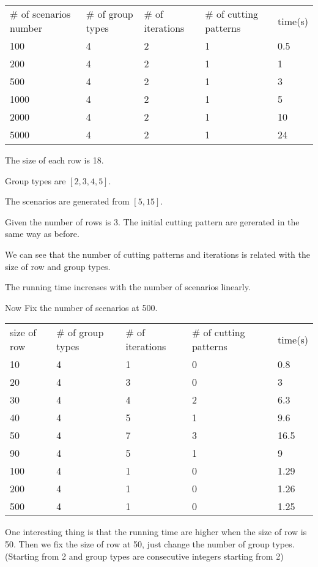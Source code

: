 \begin{table}[ht]
  \begin{tabular}{l|l|l|l|l}
  \hline
  \# of scenarios number & \# of group types & \# of iterations & \# of cutting patterns & time(s) \\
  100  & 4  & 2 & 1 & 0.5 \\
  200  & 4  & 2 & 1 & 1 \\
  500  & 4  & 2 & 1 & 3 \\
  1000 & 4 & 2 & 1 & 5 \\
  2000 & 4 & 2 & 1 & 10 \\
  5000 & 4 & 2 & 1 & 24\\
  \hline
  \end{tabular}
\end{table}

The size of each row is 18.

Group types are $[2,3,4,5]$.

The scenarios are generated from $[5,15]$.

Given the number of rows is 3. The initial cutting pattern are gererated in the same way as before.

We can see that the number of cutting patterns and iterations is related with the size of row and group types.

The running time increases with the number of scenarios linearly.

Now Fix the number of scenarios at 500.

\begin{table}[ht]
  \begin{tabular}{l|l|l|l|l}
  \hline
  size of row & \# of group types & \# of iterations & \# of cutting patterns & time(s) \\
  10  & 4  & 1 & 0 & 0.8 \\
  20  & 4  & 3 & 0 & 3 \\
  30  & 4  & 4 & 2 & 6.3 \\
  40  & 4  & 5 & 1 & 9.6 \\
  50  & 4  & 7 & 3 & 16.5 \\
  90  & 4  & 5 & 1 & 9 \\
  100 & 4 & 1 & 0 & 1.29 \\
  200 & 4 & 1 & 0 & 1.26 \\
  500 & 4 & 1 & 0 & 1.25 \\
  \hline
  \end{tabular}
\end{table}

One interesting thing is that the running time are higher when the size of row is 50. Then we fix the size of row at 50, just change the number of group types. (Starting from 2 and group types are consecutive integers starting from 2)

